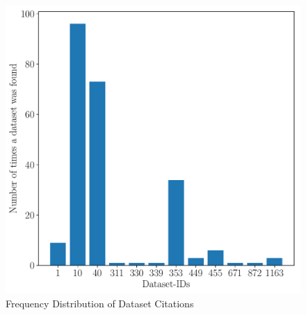 \documentclass[runningheads]{llncs}
\begin{document}
\begin{enumerate}
\begin{figure}[!htb]
    \centering
    \includegraphics[scale=0.45]{images/freq.pdf}
    \caption{Frequency Distribution of Dataset Citations}
    \label{fig:graph}
\end{figure}


\end{enumerate}
\end{document}
